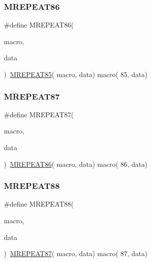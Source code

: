 \mbox{\label{group__group__sam0__utils__mrepeat_ga30355c63cfe5a0c1ed9928f24d941206}} 
\subsubsection{\texorpdfstring{MREPEAT86}{MREPEAT86}}
{\footnotesize\ttfamily \#define M\+R\+E\+P\+E\+A\+T86(\begin{DoxyParamCaption}\item[{}]{macro,  }\item[{}]{data }\end{DoxyParamCaption})~\mbox{\hyperlink{group__group__sam0__utils__mrepeat_gac310966754e3b2f99d3bc542eabbcd32}{M\+R\+E\+P\+E\+A\+T85}}( macro, data)   macro( 85, data)}

\mbox{\label{group__group__sam0__utils__mrepeat_gad120b88ef29e4f9b0f9017dc084674af}} 
\subsubsection{\texorpdfstring{MREPEAT87}{MREPEAT87}}
{\footnotesize\ttfamily \#define M\+R\+E\+P\+E\+A\+T87(\begin{DoxyParamCaption}\item[{}]{macro,  }\item[{}]{data }\end{DoxyParamCaption})~\mbox{\hyperlink{group__group__sam0__utils__mrepeat_ga30355c63cfe5a0c1ed9928f24d941206}{M\+R\+E\+P\+E\+A\+T86}}( macro, data)   macro( 86, data)}

\mbox{\label{group__group__sam0__utils__mrepeat_ga7d45423a28a7d85979fa03dfe7b26fdd}} 
\subsubsection{\texorpdfstring{MREPEAT88}{MREPEAT88}}
{\footnotesize\ttfamily \#define M\+R\+E\+P\+E\+A\+T88(\begin{DoxyParamCaption}\item[{}]{macro,  }\item[{}]{data }\end{DoxyParamCaption})~\mbox{\hyperlink{group__group__sam0__utils__mrepeat_gad120b88ef29e4f9b0f9017dc084674af}{M\+R\+E\+P\+E\+A\+T87}}( macro, data)   macro( 87, data)}

